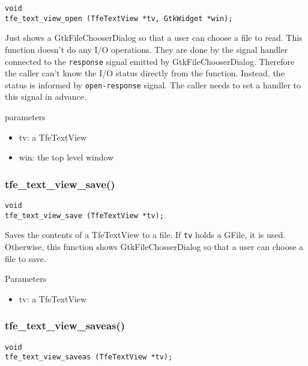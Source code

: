 \begin{lstlisting}
void
tfe_text_view_open (TfeTextView *tv, GtkWidget *win);
\end{lstlisting}

Just shows a GtkFileChooserDialog so that a user can choose a file to
read. This function doesn't do any I/O operations. They are done by the
signal handler connected to the \passthrough{\lstinline!response!}
signal emitted by GtkFileChooserDialog. Therefore the caller can't know
the I/O status directly from the function. Instead, the status is
informed by \passthrough{\lstinline!open-response!} signal. The caller
needs to set a handler to this signal in advance.

parameters

\begin{itemize}
\tightlist
\item
  tv: a TfeTextView
\item
  win: the top level window
\end{itemize}

\hypertarget{tfe_text_view_save}{%
\subsubsection{tfe\_text\_view\_save()}\label{tfe_text_view_save}}

\begin{lstlisting}
void
tfe_text_view_save (TfeTextView *tv);
\end{lstlisting}

Saves the contents of a TfeTextView to a file. If
\passthrough{\lstinline!tv!} holds a GFile, it is used. Otherwise, this
function shows GtkFileChosserDialog so that a user can choose a file to
save.

Parameters

\begin{itemize}
\tightlist
\item
  tv: a TfeTextView
\end{itemize}

\hypertarget{tfe_text_view_saveas}{%
\subsubsection{tfe\_text\_view\_saveas()}\label{tfe_text_view_saveas}}

\begin{lstlisting}
void
tfe_text_view_saveas (TfeTextView *tv);
\end{lstlisting}

